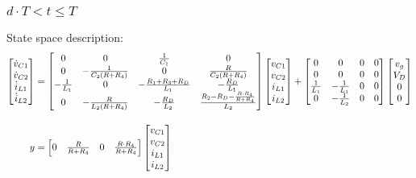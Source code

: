 \subsubsection{$d \cdot T < t \leq T$}
State space description:
\begin{align*}
\begin{bmatrix}
\dispdot{v_{C1}} \\ \dispdot{v_{C2}} \\ \dispdot{i_{L1}} \\ \dispdot{i_{L2}}
\end{bmatrix}
& =
\begin{bmatrix}
0 & 0 & \frac{1}{C_1} & 0\\
0 & \minus\frac{1}{C_2(R + R_4)} & 0 & \frac{R}{C_2(R + R_4)}\\
\minus\frac{1}{L_1} & 0 & \minus\frac{R_1 + R_3 + R_D}{L_1} & \minus\frac{R_D}{L_1}\\
0 & \minus\frac{R}{L_2(R + R_4)} & \minus\frac{R_D}{L_2} & \frac{R_2 - R_D - \frac{R \cdot R_4}{R + R_4}}{L_2}
\end{bmatrix}
\begin{bmatrix}
v_{C1} \\ v_{C2} \\ i_{L1} \\ i_{L2}
\end{bmatrix}
+
\begin{bmatrix}
0 & 0 & 0 & 0\\
0 & 0 & 0 & 0\\
\frac{1}{L_1} & {-}\frac{1}{L_1} & 0 & 0\\
0 & {-}\frac{1}{L_2} & 0 & 0
\end{bmatrix}
\begin{bmatrix}
v_g \\ V_D \\ 0 \\ 0
\end{bmatrix}
\\[11pt]
y &=
\begin{bmatrix}
0 & \frac{R}{R + R_4} & 0 & \frac{R \cdot R_4}{R + R_4}
\end{bmatrix}
\begin{bmatrix}
v_{C1} \\ v_{C2} \\ i_{L1} \\ i_{L2}
\end{bmatrix}
\end{align*}
